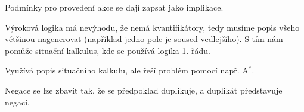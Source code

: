 \documentclass[12pt]{article}					%
\begin{document}
\begin{definice}
	Podmínky pro provedení akce se dají zapsat jako implikace.
\end{definice}

\begin{definice}
	Výroková logika má nevýhodu, že nemá kvantifikátory, tedy musíme popis všeho většinou nagenerovat (například jedno pole je soused vedlejšího). S tím nám pomůže situační kalkulus, kde se používá logika 1. řádu.
\end{definice}

\begin{definice}
	Využívá popis situačního kalkulu, ale řeší problém pomocí např. A$^*$.
\end{definice}

\begin{poznamka}
	Negace se lze zbavit tak, že se předpoklad duplikuje, a duplikát představuje negaci.
\end{poznamka}
\end{document}

